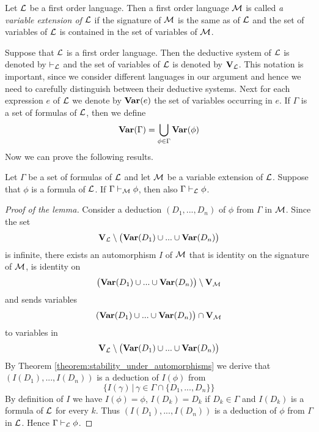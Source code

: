 \begin{definition}
Let ${\mathcal L}$ be a first order language. Then a first order language ${\mathcal M}$ is called \textit{a variable extension of ${\mathcal L}$} if the signature of ${\mathcal M}$ is the same as of ${\mathcal L}$ and the set of variables of ${\mathcal L}$ is contained in the set of variables of ${\mathcal M}$.
\end{definition}
\noindent
Suppose that ${\mathcal L}$ is a first order language. Then the deductive system of ${\mathcal L}$ is denoted by $\vdash_{{\mathcal L}}$ and the set of variables of ${\mathcal L}$ is denoted by $\mathbf{V}_{\mathcal L}$. This notation is important, since we consider different languages in our argument and hence we need to carefully distinguish between their deductive systems. Next for each expression $e$ of ${\mathcal L}$ we denote by $\mathbf{Var}(e)$ the set of variables occurring in $e$. If $\Gamma$ is a set of formulas of ${\mathcal L}$, then we define
$$\mathbf{Var}(\Gamma) = \bigcup_{\phi \in \Gamma} \mathbf{Var}(\phi)$$
Now we can prove the following results.

\begin{lemma}\label{lemma:deduction_in_variable_extensions_of_a_formula_that_belongs_to_extended_language}
Let $\Gamma$ be a set of formulas of ${\mathcal L}$ and let ${\mathcal M}$ be a variable extension of ${\mathcal L}$. Suppose that $\phi$ is a formula of ${\mathcal L}$. If $\Gamma \vdash_{{\mathcal M}} \phi$, then also $\Gamma \vdash_{{\mathcal L}} \phi$.
\end{lemma}
\begin{proof}[Proof of the lemma]
Consider a deduction $(D_1, ..., D_n)$ of $\phi$ from $\Gamma$ in ${\mathcal M}$. Since the set
$$\mathbf{V}_{{\mathcal L}} \setminus \big(\mathbf{Var}(D_1) \cup ... \cup \mathbf{Var}(D_n)\big)$$
is infinite, there exists an automorphism $I$ of ${\mathcal M}$ that is identity on the signature of ${\mathcal M}$, is identity on
$$\big(\mathbf{Var}(D_1) \cup ... \cup \mathbf{Var}(D_n)\big) \setminus \mathbf{V}_{{\mathcal M}}$$
and sends variables
$$(\mathbf{Var}(D_1) \cup ... \cup \mathbf{Var}(D_n)\big) \cap \mathbf{V}_{{\mathcal M}}$$
to variables in
$$\mathbf{V}_{{\mathcal L}} \setminus \big(\mathbf{Var}(D_1) \cup ... \cup \mathbf{Var}(D_n)\big)$$
By Theorem \ref{theorem:stability_under_automorphisms} we derive that $(I(D_1),...,I(D_n))$ is a deduction of $I(\phi)$ from
$$\big\{I(\gamma)\,\big|\,\gamma \in \Gamma \cap \{D_1,...,D_n\}\big\}$$
By definition of $I$ we have $I(\phi) = \phi$, $I(D_k) = D_k$ if $D_k \in \Gamma$ and $I(D_k)$ is a formula of ${\mathcal L}$ for every $k$. Thus $\left(I(D_1),...,I(D_n)\right)$ is a deduction of $\phi$ from $\Gamma$ in ${\mathcal L}$. Hence $\Gamma \vdash_{{\mathcal L}} \phi$.
\end{proof}


